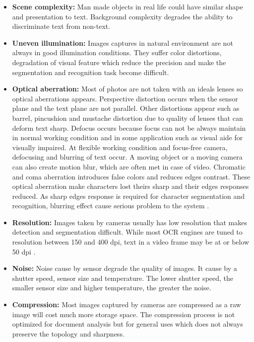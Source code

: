\begin{itemize}
\item{\textbf{Scene complexity:}} Man made objects in real life could have similar shape and presentation to text. Background complexity degrades the ability to discriminate text from non-text. 

\item{\textbf{Uneven illumination:}} Images captures in natural environment are not always in good illumination conditions. They suffer color distortions, degradation of visual feature which reduce the precision and make the segmentation and recognition task become difficult.

\item{\textbf{Optical aberration: }} Most of photos are not taken with an ideals lenses so optical aberrations appears. Perspective distortion occurs when the sensor plane and the text plane are not parallel. Other distortions appear such as barrel, pincushion and mustache distortion due to quality of lenses that can deform text sharp. Defocus occurs because focus can not be always maintain in normal working condition and in some application such as visual aide for visually impaired. At flexible working condition and focus-free camera, defocusing and blurring of text occur. A moving object or a moving camera can also create motion blur, which are often met in case of video. Chromatic and coma aberration introduces false colors and reduces edges contrast. These optical aberration make characters lost theirs sharp and their edges responses reduced. As sharp edges response is required for character segmentation and recognition, blurring effect cause serious problem to the system \cite{Liang.2005.IJDAR}.

\item{\textbf{Resolution:}} Images taken by cameras usually has low resolution that makes detection and segmentation difficult. While most OCR engines are tuned to resolution between 150 and 400 dpi, text in a video frame may be at or below 50 dpi \cite{Liang.2005.IJDAR}.

\item{\textbf{Noise: }} Noise cause by sensor degrade the quality of images. It cause by a shutter speed, sensor size and temperature. The lower shutter speed, the smaller sensor size and higher temperature, the greater the noise. 

\item{\textbf{Compression: }} Most images captured by cameras are compressed as a raw image will cost much more storage space. The compression process is not optimized for document analysis but for general uses which does not always preserve the topology and sharpness.


\end{itemize}
